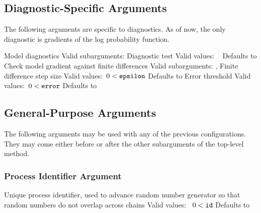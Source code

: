 
\subsection{Diagnostic-Specific Arguments}

The following arguments are specific to diagnostics.  As of now, the
only diagnostic is gradients of the log probability function.

\begin{description}

    {Model diagnostics}
    {Valid subarguments: }
%
      {Diagnostic test}
      {Valid values: \  }
      {Defaults to }
%
        {Check model gradient against finite differences}
        {Valid subarguments: , }
%
        {Finite difference step size}
	    {Valid values:\ $0 < \mbox{{\tt epsilon}}$}
	    {Defaults to }
%
       {Error threshold}
	   {Valid values:\ $0 < \mbox{{\tt error}}$}
	   {Defaults to }
%
\end{description}

\subsection{General-Purpose Arguments}

The following arguments may be used with any of the previous
configurations.   They may come either before or after the other
subarguments of the top-level method.

\subsubsection{Process Identifier Argument}

\begin{description}
  {Unique process identifier, used to advance random number generator so that random numbers do not overlap across chains}
  {Valid values: \  $0 < \mbox{{\tt id}}$}
  {Defaults to }
%
\end{description}

